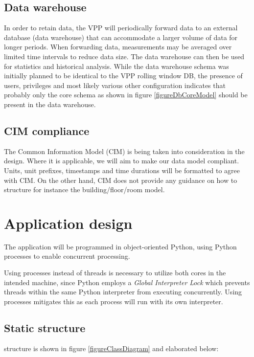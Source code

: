 \subsection{Data warehouse}
In order to retain data, the VPP will periodically forward data to an external database (data warehouse) that can accommodate a larger volume of data for longer periods. When forwarding data, measurements may be averaged over limited time intervals to reduce data size. The data warehouse can then be used for statistics and historical analysis. While the data warehouse schema was initially planned to be identical to the VPP rolling window DB, the presence of users, privileges and most likely various other configuration indicates that probably only the core schema as shown in figure \ref{figureDbCoreModel} should be present in the data warehouse. 

\subsection{CIM compliance}
The Common Information Model (CIM) is being taken into consideration in the design. Where it is applicable, we will aim to make our data model compliant. Units, unit prefixes, timestamps and time durations will be formatted to agree with CIM. On the other hand, CIM does not provide any guidance on how to structure for instance the building/floor/room model.

\newpage
\section{Application design}
The application will be programmed in object-oriented Python, using Python processes to enable concurrent processing. 

Using processes instead of threads is necessary to utilize both cores in the intended machine, since Python employs a \emph{Global Interpreter Lock} which prevents threads within the same Python interpreter from executing concurrently. Using processes mitigates this as each process will run with its own interpreter. 

\subsection{Static structure}
structure is shown in figure \ref{figureClassDiagram} and elaborated below:

